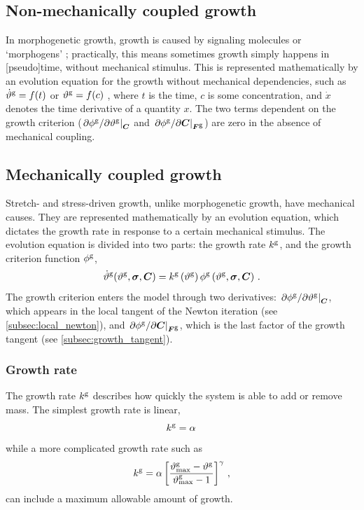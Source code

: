 \documentclass[10pt,letterpaper,oneside]{report}
\newcommand{\ten}[1]{\mbox{\boldmath $#1$}{}}
\newcommand{\scas}[1]{\mbox{{\scriptsize{${\rm{#1}}$}}}{}}
\newcommand{\tens}[1]{\mbox{\boldmath{\scriptsize{$#1$}}}{}}
\begin{document}
\subsection{Non-mechanically coupled growth}
In morphogenetic growth, growth is caused by signaling molecules or `morphogens' \autocite{Taber1995}; practically, this means sometimes growth simply happens in [pseudo]time, without mechanical stimulus.  This is represented mathematically by an evolution equation for the growth without mechanical dependencies, such as
$\dot{\vartheta}^{\scas{g}} = f(t)$ or $\vartheta^{\scas{g}} = f(c)$ , 
where $t$ is the time, $c$ is some concentration, and $\dot{x}$ denotes the time derivative of a quantity $x$. 
The two terms dependent on the growth criterion ($ \left. \partial \phi^{\scas{g}} / \partial \vartheta^{\scas{g}} \right|_{\tens{C}} $ and $ \left. \partial \phi^{\scas{g}} / \partial \ten{C} \right|_{\tens{F}^{\scas{g}}}$) are zero in the absence of mechanical coupling.


\subsection{Mechanically coupled growth}
Stretch- and stress-driven growth, unlike morphogenetic growth, have mechanical causes.  They are represented mathematically by an evolution equation, which dictates the growth rate in response to a certain mechanical stimulus.  The evolution equation is divided into two parts: the growth rate $k^{\scas{g}}$, and the growth criterion function $\phi^{\scas{g}}$,
\begin{equation}
\dot{\vartheta}^{\scas{g}} ( \vartheta^{\scas{g}}, \ten{\sigma}, \ten{C} ) = k^{\scas{g}} \left( \vartheta^{\scas{g}} \right) \phi^{\scas{g}} \left( \vartheta^{\scas{g}}, \ten{\sigma}, \ten{C} \right) \, . 
\end{equation}
The growth criterion enters the model through two derivatives: $ \left. \partial \phi^{\scas{g}} / \partial \vartheta^{\scas{g}} \right|_{\tens{C}} $, which appears in the local tangent of the Newton iteration (see \autoref{subsec:local_newton}), and $ \left. \partial \phi^{\scas{g}} / \partial \ten{C} \right|_{\tens{F}^{\scas{g}}}$, which is the last factor of the growth tangent (see \autoref{subsec:growth_tangent}).

\subsubsection{Growth rate}
\label{subsec:rate}
The growth rate $k^{\scas{g}}$ describes how quickly the system is able to add or remove mass.  The simplest growth rate is linear, 
\begin{equation}
k^{\scas{g}} = \alpha \, 
\end{equation}
while a more complicated growth rate such as 
\begin{equation}
k^{\scas{g}} = \alpha \left[ \frac{ \vartheta^{\scas{g}}_{\scas{max}} - \vartheta^{\scas{g}} }{ \vartheta^{\scas{g}}_{\scas{max}} - 1} \right]^{\gamma} \, ,  
\end{equation}
can include a maximum allowable amount of growth.
\end{document}
